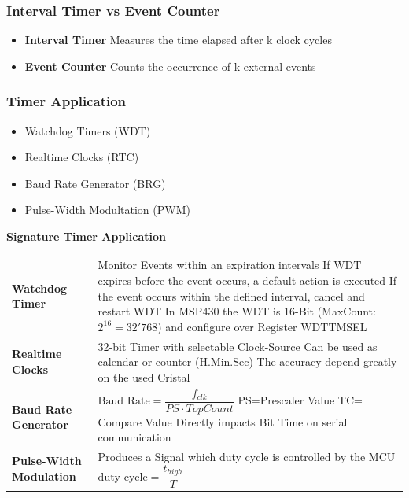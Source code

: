 \begin{minipage}{0.6\linewidth}
	\subsubsection{Interval Timer vs Event Counter}
	\begin{itemize}
		\item \textbf{Interval Timer}
		\subitem Measures the time elapsed after k clock cycles
		\item \textbf{Event Counter}
		\subitem Counts the occurrence of k external events
	\end{itemize}
\end{minipage}
\begin{minipage}{0.6\linewidth}
	\subsubsection{Timer Application}
	\begin{itemize}
		\item Watchdog Timers (WDT)
		\item Realtime Clocks (RTC)
		\item Baud Rate Generator (BRG)
		\item Pulse-Width Modultation (PWM)
	\end{itemize}
\end{minipage}	

\textbf{Signature Timer Application }\newline
\begin{tabular}{p{5cm} p{15cm}}
	\textbf{Watchdog Timer } &
    Monitor Events within an expiration intervals\newline
	 If WDT expires before the event occurs, a default action is executed\newline
	 If the event occurs within the defined interval, cancel and restart WDT\newline
	 In MSP430 the WDT is 16-Bit (MaxCount: $2^{16}=32'768$) \newline
	 and configure over Register WDTTMSEL\\
     
	\textbf{Realtime Clocks} &
    32-bit Timer with selectable Clock-Source\newline
    Can be used as calendar or counter (H.Min.Sec)\newline
    The accuracy depend greatly on the used Cristal\\
    
	\textbf{Baud Rate Generator} &
     $ \text{Baud Rate}=\dfrac{f_{clk}}{PS \cdot TopCount} $\newline
     PS=Prescaler Value \quad TC= Compare Value\newline
     Directly impacts Bit Time on serial communication\\
     
	\textbf{Pulse-Width Modulation} &
    Produces a Signal which duty cycle is controlled by the MCU \newline
    $ \text{duty cycle}=\dfrac{t_{high}}{T} $\\
\end{tabular}

